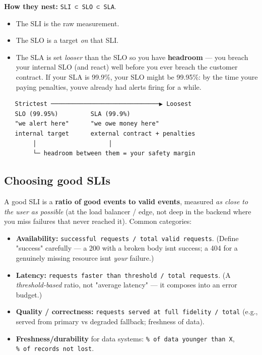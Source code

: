 \documentclass[11pt]{article}
\providecommand{\tightlist}{\setlength{\itemsep}{1pt}\setlength{\parskip}{0pt}}
\begin{document}
\textbf{How they nest:} \texttt{SLI\ ⊂\ SLO\ ⊂\ SLA}.

\begin{itemize}
\tightlist
\item
  The SLI is the raw measurement.
\item
  The SLO is a target \emph{on} that SLI.
\item
  The SLA is set \emph{looser} than the SLO so you have \textbf{headroom} --- you breach your internal SLO (and react) well before you ever breach the customer contract. If your SLA is 99.9\%, your SLO might be 99.95\%: by the time you\textquotesingle re paying penalties, you\textquotesingle ve already had alerts firing for a while.
\end{itemize}

\setcodelang{}

\begin{verbatim}
   Strictest ──────────────────────────────▶ Loosest
   SLO (99.95%)         SLA (99.9%)
   "we alert here"      "we owe money here"
   internal target      external contract + penalties
        │                    │
        └─ headroom between them = your safety margin
\end{verbatim}

\subsection{Choosing good SLIs}\label{choosing-good-slis}

A good SLI is a \textbf{ratio of good events to valid events}, measured \emph{as close to the user as possible} (at the load balancer / edge, not deep in the backend where you miss failures that never reached it). Common categories:

\begin{itemize}
\tightlist
\item
  \textbf{Availability:} \texttt{successful\ requests\ /\ total\ valid\ requests}. (Define "success" carefully --- a 200 with a broken body isn\textquotesingle t success; a 404 for a genuinely missing resource isn\textquotesingle t \emph{your} failure.)
\item
  \textbf{Latency:} \texttt{requests\ faster\ than\ threshold\ /\ total\ requests}. (A \emph{threshold-based} ratio, not "average latency" --- it composes into an error budget.)
\item
  \textbf{Quality / correctness:} \texttt{requests\ served\ at\ full\ fidelity\ /\ total} (e.g., served from primary vs degraded fallback; freshness of data).
\item
  \textbf{Freshness/durability} for data systems: \texttt{\%\ of\ data\ younger\ than\ X}, \texttt{\%\ of\ records\ not\ lost}.
\end{itemize}
\end{document}

